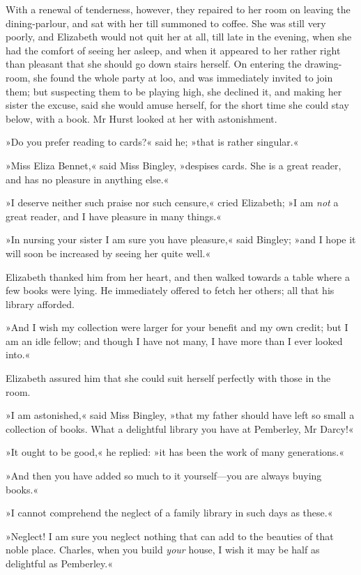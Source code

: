 With a renewal of tenderness, however, they repaired to her room on leaving the dining-parlour, and sat with her till summoned to coffee. She was still very poorly, and Elizabeth would not quit her at all, till late in the evening, when she had the comfort of seeing her asleep, and when it appeared to her rather right than pleasant that she should go down stairs herself. On entering the drawing-room, she found the whole party at loo, and was immediately invited to join them; but suspecting them to be playing high, she declined it, and making her sister the excuse, said she would amuse herself, for the short time she could stay below, with a book. Mr Hurst looked at her with astonishment.

»Do you prefer reading to cards?« said he; »that is rather singular.«

»Miss Eliza Bennet,« said Miss Bingley, »despises cards. She is a great reader, and has no pleasure in anything else.«

»I deserve neither such praise nor such censure,« cried Elizabeth; »I am \textit{not} a great reader, and I have pleasure in many things.«

»In nursing your sister I am sure you have pleasure,« said Bingley; »and I hope it will soon be increased by seeing her quite well.«

Elizabeth thanked him from her heart, and then walked towards a table where a few books were lying. He immediately offered to fetch her others; all that his library afforded.

»And I wish my collection were larger for your benefit and my own credit; but I am an idle fellow; and though I have not many, I have more than I ever looked into.«

Elizabeth assured him that she could suit herself perfectly with those in the room.

»I am astonished,« said Miss Bingley, »that my father should have left so small a collection of books. What a delightful library you have at Pemberley, Mr Darcy!«

»It ought to be good,« he replied: »it has been the work of many generations.«

»And then you have added so much to it yourself—you are always buying books.«

»I cannot comprehend the neglect of a family library in such days as these.«

»Neglect! I am sure you neglect nothing that can add to the beauties of that noble place. Charles, when you build \textit{your} house, I wish it may be half as delightful as Pemberley.«

